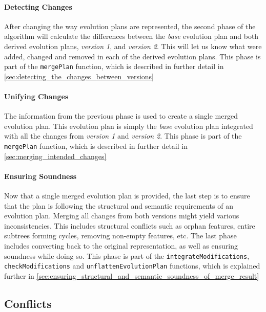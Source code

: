 \documentclass[a4paper,english]{ifimaster}
\begin{document}
\paragraph{Detecting Changes}%
\label{par:detecting_changes}

After changing the way evolution plans are represented, the second phase of the algorithm will calculate the differences between the \textit{base} evolution plan and both derived evolution plans, \textit{version 1}, and \textit{version 2}. This will let us know what were added, changed and removed in each of the derived evolution plans. This phase is part of the \texttt{mergePlan} function, which is described in further detail in \vref{sec:detecting_the_changes_between_versions}

\paragraph{Unifying Changes}%
\label{par:unifying_changes}

The information from the previous phase is used to create a single merged evolution plan. This evolution plan is simply the \textit{base} evolution plan integrated with all the changes from \textit{version 1} and \textit{version 2}. This phase is part of the \texttt{mergePlan} function, which is described in further detail in \vref{sec:merging_intended_changes}

\paragraph{Ensuring Soundness}%
\label{par:ensuring_soundness}

Now that a single merged evolution plan is provided, the last step is to ensure that the plan is following the structural and semantic requirements of an evolution plan. Merging all changes from both versions might yield various inconsistencies. This includes structural conflicts such as orphan features, entire subtrees forming cycles, removing non-empty features, etc. The last phase includes converting back to the original representation, as well as ensuring soundness while doing so. This phase is part of the \texttt{integrate\-Modifications}, \texttt{check\-Modifications} and \texttt{unflatten\-Evolution\-Plan} functions, which is explained further in \vref{sec:ensuring_structural_and_semantic_soundness_of_merge_result}

\subsection{Conflicts}%
\label{sub:conflicts}
\end{document}
